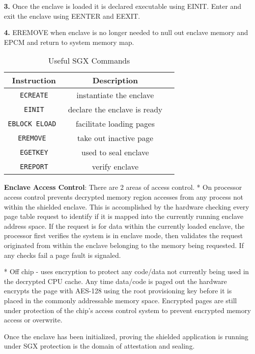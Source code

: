 \textbf{3.} Once the enclave is loaded it is declared executable using EINIT. Enter and exit the enclave using EENTER and EEXIT. 

\textbf{4.} EREMOVE when enclave is no longer needed to null out enclave memory and EPCM and return to system memory map.


\begin{table}
\centering
  \caption{Useful SGX Commands}
  \label{tab:cmds}
  \begin{tabular}{ccl}
    \toprule
    Instruction & Description\\
    \midrule
    \texttt{ECREATE} & instantiate the enclave  \\
    \texttt{EINIT}& declare the enclave is ready\\
    \texttt{EBLOCK ELOAD }&  facilitate loading pages\\
    \texttt{EREMOVE }& take out inactive page \\
    \texttt{EGETKEY}& used to seal enclave\\
    \texttt{EREPORT}&  verify enclave\\
    \bottomrule
  \end{tabular}
\end{table}

\textbf{Enclave Access Control}: There are 2 areas of access control. 
* On processor access control prevents decrypted memory region accesses from any process not within the shielded enclave. This is accomplished by the hardware checking every page table request to identify if it is mapped into the currently running enclave address space. If the request is for data within the currently loaded enclave, the processor first verifies the system is in enclave mode, then validates the request originated from within the enclave belonging to the memory being requested. If any checks fail a page fault is signaled. \cite{Schwarz_Weiser_Gruss_Maurice_Mangard_2017}

* Off chip - uses encryption to protect any code/data not currently being used in the decrypted CPU cache. Any time data/code is paged out the hardware encrypts the page with AES-128 using the root provisioning key before it is placed in the commonly addressable memory space. Encrypted pages are still under protection of the chip's access control system to prevent encrypted memory access or overwrite. 

Once the enclave has been initialized, proving the shielded application is running under SGX protection is the domain of attestation and sealing. 	

